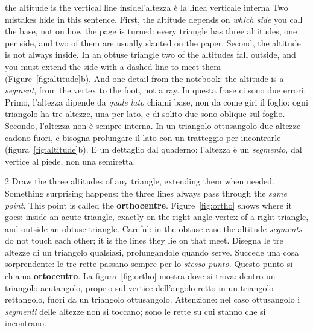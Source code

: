 \documentclass[10pt,a4paper,oneside]{book}
\newif\ifIT
\newenvironment{bi}%
  {\begin{paracol}{2}\global\ITfalse\selectlanguage{english}}%
  {\end{paracol}}
\newcommand{\IT}{\switchcolumn\global\ITtrue\selectlanguage{italian}}
\begin{document}
\begin{trap}{the altitude is the vertical line inside}{l'altezza è la linea verticale interna}
Two mistakes hide in this sentence. First, the altitude depends on \emph{which side} you call the base, not on how the page is turned: every triangle has three altitudes, one per side, and two of them are usually slanted on the paper. Second, the altitude is not always inside. In an obtuse triangle two of the altitudes fall outside, and you must extend the side with a dashed line to meet them (Figure~\ref{fig:altitude}b). And one detail from the notebook: the altitude is a \emph{segment}, from the vertex to the foot, not a ray.
\tcblower
In questa frase ci sono due errori. Primo, l'altezza dipende da \emph{quale lato} chiami base, non da come giri il foglio: ogni triangolo ha tre altezze, una per lato, e di solito due sono oblique sul foglio. Secondo, l'altezza non è sempre interna. In un triangolo ottusangolo due altezze cadono fuori, e bisogna prolungare il lato con un tratteggio per incontrarle (figura~\ref{fig:altitude}b). E un dettaglio dal quaderno: l'altezza è un \emph{segmento}, dal vertice al piede, non una semiretta.
\end{trap}

\begin{bi}
Draw the three altitudes of any triangle, extending them when needed. Something surprising happens: the three lines always pass through the \emph{same point}. This point is called the \textbf{orthocentre}. Figure~\ref{fig:ortho} shows where it goes: inside an acute triangle, exactly on the right angle vertex of a right triangle, and outside an obtuse triangle. Careful: in the obtuse case the altitude \emph{segments} do not touch each other; it is the lines they lie on that meet.
\IT
Disegna le tre altezze di un triangolo qualsiasi, prolungandole quando serve. Succede una cosa sorprendente: le tre rette passano sempre per lo \emph{stesso punto}. Questo punto si chiama \textbf{ortocentro}. La figura~\ref{fig:ortho} mostra dove si trova: dentro un triangolo acutangolo, proprio sul vertice dell'angolo retto in un triangolo rettangolo, fuori da un triangolo ottusangolo. Attenzione: nel caso ottusangolo i \emph{segmenti} delle altezze non si toccano; sono le rette su cui stanno che si incontrano.
\end{bi}
\end{document}
